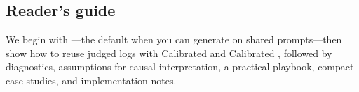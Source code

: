 \subsection{Reader's guide}

We begin with \dm---the default when you can generate on shared prompts---then show how to reuse judged logs with Calibrated \ips{} and Calibrated \dr, followed by diagnostics, assumptions for causal interpretation, a practical playbook, compact case studies, and implementation notes.
